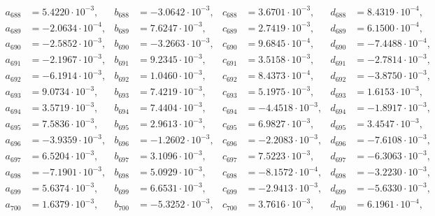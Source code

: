 \begin{align*}
  a_{ 688 } &= 5.4220 \cdot 10^{ -3 }, & b_{ 688 } &= -3.0642 \cdot 10^{ -3 }, & c_{ 688 } &= 3.6701 \cdot 10^{ -3 }, & d_{ 688 } &= 8.4319 \cdot 10^{ -4 }, \\ 
  a_{ 689 } &= -2.0634 \cdot 10^{ -4 }, & b_{ 689 } &= 7.6247 \cdot 10^{ -3 }, & c_{ 689 } &= 2.7419 \cdot 10^{ -3 }, & d_{ 689 } &= 6.1500 \cdot 10^{ -4 }, \\ 
  a_{ 690 } &= -2.5852 \cdot 10^{ -3 }, & b_{ 690 } &= -3.2663 \cdot 10^{ -3 }, & c_{ 690 } &= 9.6845 \cdot 10^{ -4 }, & d_{ 690 } &= -7.4488 \cdot 10^{ -4 }, \\ 
  a_{ 691 } &= -2.1967 \cdot 10^{ -3 }, & b_{ 691 } &= 9.2345 \cdot 10^{ -3 }, & c_{ 691 } &= 3.5158 \cdot 10^{ -3 }, & d_{ 691 } &= -2.7814 \cdot 10^{ -3 }, \\ 
  a_{ 692 } &= -6.1914 \cdot 10^{ -3 }, & b_{ 692 } &= 1.0460 \cdot 10^{ -3 }, & c_{ 692 } &= 8.4373 \cdot 10^{ -4 }, & d_{ 692 } &= -3.8750 \cdot 10^{ -3 }, \\ 
  a_{ 693 } &= 9.0734 \cdot 10^{ -3 }, & b_{ 693 } &= 7.4219 \cdot 10^{ -3 }, & c_{ 693 } &= 5.1975 \cdot 10^{ -3 }, & d_{ 693 } &= 1.6153 \cdot 10^{ -3 }, \\ 
  a_{ 694 } &= 3.5719 \cdot 10^{ -3 }, & b_{ 694 } &= 7.4404 \cdot 10^{ -3 }, & c_{ 694 } &= -4.4518 \cdot 10^{ -3 }, & d_{ 694 } &= -1.8917 \cdot 10^{ -3 }, \\ 
  a_{ 695 } &= 7.5836 \cdot 10^{ -3 }, & b_{ 695 } &= 2.9613 \cdot 10^{ -3 }, & c_{ 695 } &= 6.9827 \cdot 10^{ -3 }, & d_{ 695 } &= 3.4547 \cdot 10^{ -3 }, \\ 
  a_{ 696 } &= -3.9359 \cdot 10^{ -3 }, & b_{ 696 } &= -1.2602 \cdot 10^{ -3 }, & c_{ 696 } &= -2.2083 \cdot 10^{ -3 }, & d_{ 696 } &= -7.6108 \cdot 10^{ -3 }, \\ 
  a_{ 697 } &= 6.5204 \cdot 10^{ -3 }, & b_{ 697 } &= 3.1096 \cdot 10^{ -3 }, & c_{ 697 } &= 7.5223 \cdot 10^{ -3 }, & d_{ 697 } &= -6.3063 \cdot 10^{ -3 }, \\ 
  a_{ 698 } &= -7.1901 \cdot 10^{ -3 }, & b_{ 698 } &= 5.0929 \cdot 10^{ -3 }, & c_{ 698 } &= -8.1572 \cdot 10^{ -4 }, & d_{ 698 } &= -3.2230 \cdot 10^{ -3 }, \\ 
  a_{ 699 } &= 5.6374 \cdot 10^{ -3 }, & b_{ 699 } &= 6.6531 \cdot 10^{ -3 }, & c_{ 699 } &= -2.9413 \cdot 10^{ -3 }, & d_{ 699 } &= -5.6330 \cdot 10^{ -3 }, \\ 
  a_{ 700 } &= 1.6379 \cdot 10^{ -3 }, & b_{ 700 } &= -5.3252 \cdot 10^{ -3 }, & c_{ 700 } &= 3.7616 \cdot 10^{ -3 }, & d_{ 700 } &= 6.1961 \cdot 10^{ -4 }, \\ 

\end{align*}
